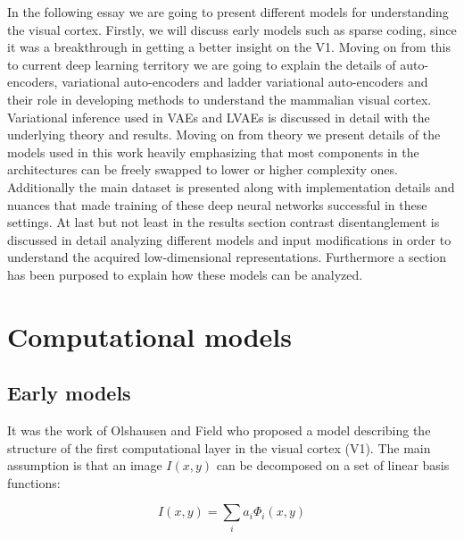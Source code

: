 \documentclass[12pt, english]{article}
\begin{document}
\vspace{7mm}

\par In the following essay we are going to present different models for understanding the visual cortex. Firstly, we will discuss early models such as sparse coding, since it was a breakthrough in getting a better insight on the V1. Moving on from this to current deep learning territory we are going to explain the details of auto-encoders, variational auto-encoders and ladder variational auto-encoders and their role in developing methods to understand the mammalian visual cortex. Variational inference used in VAEs and LVAEs is discussed in detail with the underlying theory and results. Moving on from theory we present details of the models used in this work heavily emphasizing that most components in the architectures can be freely swapped to lower or higher complexity ones. Additionally the main dataset is presented along with implementation details and nuances that made training of these deep neural networks successful in these settings. At last but not least in the results section contrast disentanglement is discussed in detail analyzing different models and input modifications in order to understand the acquired low-dimensional representations. Furthermore a section has been purposed to explain how these models can be analyzed. 

\newpage

\section{Computational models}

\vspace{7mm}

\subsection{Early models}

\vspace{5mm}

\par It was the work of Olshausen and Field \cite{olshausen1996emergence} who proposed a model describing the structure of the first computational layer in the visual cortex (V1). The main assumption is that an image $I(x, y)$ can be decomposed on a set of linear basis functions:

\vspace{4mm}

\begin{equation}
    I(x, y) = \sum_{i}a_i \Phi_{i}(x, y)
\end{equation}
\end{document}
